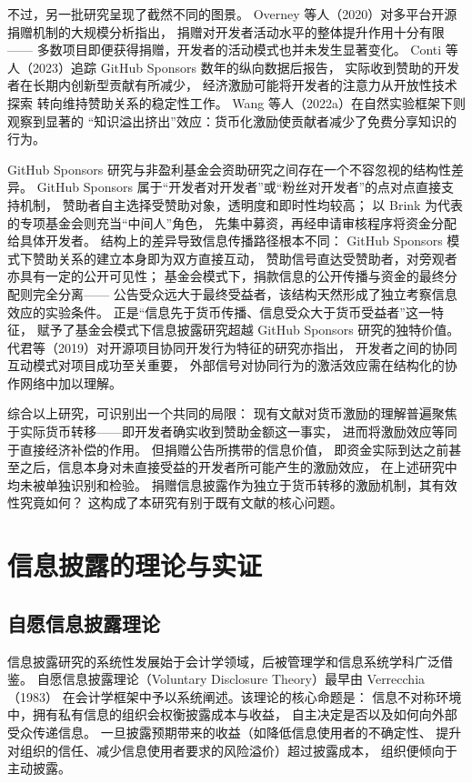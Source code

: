 \documentclass[
    type = master, %
    degree = professional,        %
    decl-page,  %
    twoside,                %
    fontset = fandol %
  ]{njuthesis}
\begin{document}
不过，另一批研究呈现了截然不同的图景。
Overney 等人（2020）对多平台开源捐赠机制的大规模分析指出，
捐赠对开发者活动水平的整体提升作用十分有限——
多数项目即便获得捐赠，开发者的活动模式也并未发生显著变化\cite{overney2020not}。
Conti 等人（2023）追踪 GitHub Sponsors 数年的纵向数据后报告，
实际收到赞助的开发者在长期内创新型贡献有所减少，
经济激励可能将开发者的注意力从开放性技术探索
转向维持赞助关系的稳定性工作\cite{conti2023incentivizing}。
Wang 等人（2022a）在自然实验框架下则观察到显著的
“知识溢出挤出”效应：货币化激励使贡献者减少了免费分享知识的行为\cite{wang2022monetary}。

GitHub Sponsors 研究与非盈利基金会资助研究之间存在一个不容忽视的结构性差异。
GitHub Sponsors 属于“开发者对开发者”或“粉丝对开发者”的点对点直接支持机制，
赞助者自主选择受赞助对象，透明度和即时性均较高；
以 Brink 为代表的专项基金会则充当“中间人”角色，
先集中募资，再经申请审核程序将资金分配给具体开发者。
结构上的差异导致信息传播路径根本不同：
GitHub Sponsors 模式下赞助关系的建立本身即为双方直接互动，
赞助信号直达受赞助者，对旁观者亦具有一定的公开可见性；
基金会模式下，捐款信息的公开传播与资金的最终分配则完全分离——
公告受众远大于最终受益者，该结构天然形成了独立考察信息效应的实验条件。
正是“信息先于货币传播、信息受众大于货币受益者”这一特征，
赋予了基金会模式下信息披露研究超越 GitHub Sponsors 研究的独特价值。
代君等（2019）对开源项目协同开发行为特征的研究亦指出，
开发者之间的协同互动模式对项目成功至关重要，
外部信号对协同行为的激活效应需在结构化的协作网络中加以理解\cite{dai2019collaborative}。

综合以上研究，可识别出一个共同的局限：
现有文献对货币激励的理解普遍聚焦于实际货币转移——即开发者确实收到赞助金额这一事实，
进而将激励效应等同于直接经济补偿的作用。
但捐赠公告所携带的信息价值，
即资金实际到达之前甚至之后，信息本身对未直接受益的开发者所可能产生的激励效应，
在上述研究中均未被单独识别和检验。
捐赠信息披露作为独立于货币转移的激励机制，其有效性究竟如何？
这构成了本研究有别于既有文献的核心问题。

\section{信息披露的理论与实证}

\subsection{自愿信息披露理论}

信息披露研究的系统性发展始于会计学领域，后被管理学和信息系统学科广泛借鉴。
自愿信息披露理论（Voluntary Disclosure Theory）最早由 Verrecchia（1983）
在会计学框架中予以系统阐述\cite{verrecchia1983discretionary}。该理论的核心命题是：
信息不对称环境中，拥有私有信息的组织会权衡披露成本与收益，
自主决定是否以及如何向外部受众传递信息。
一旦披露预期带来的收益（如降低信息使用者的不确定性、
提升对组织的信任、减少信息使用者要求的风险溢价）超过披露成本，
组织便倾向于主动披露\cite{verrecchia1983discretionary}。
\end{document}
